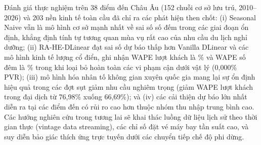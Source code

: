 \documentclass[10pt,journal,compsoc]{IEEEtran}
\begin{document}
Đánh giá thực nghiệm trên 38 điểm đến Châu Âu (152 chuỗi cơ sở lưu trú, 2010--2026) và 203 nền kinh tế toàn cầu đã chỉ ra các phát hiện then chốt: (i) Seasonal Naive vẫn là mô hình cơ sở mạnh nhất về sai số số đếm trong các giai đoạn ổn định, khẳng định tính tự tương quan mùa vụ rất cao của nhu cầu du lịch nghỉ dưỡng; (ii) RA-HE-DLinear đạt sai số dự báo thấp hơn Vanilla DLinear và các mô hình kinh tế lượng cổ điển, ghi nhận WAPE lượt khách là \ReviewerArrivalWAPE{}\% và WAPE số đêm là \ReviewerNightsWAPE{}\% trong khi loại bỏ hoàn toàn các vi phạm cận dưới vật lý (0,000\% PVR); (iii) mô hình hóa nhân tố không gian xuyên quốc gia mang lại sự ổn định hiệu quả trong các đợt sụt giảm nhu cầu nghiêm trọng (giảm WAPE lượt khách trong đại dịch từ 76,98\% xuống 66,69\%); và (iv) các cải thiện dự báo lớn nhất diễn ra tại các điểm đến có rủi ro cao hơn thuộc nhóm thu nhập trung bình cao. Các hướng nghiên cứu trong tương lai sẽ khai thác luồng dữ liệu lịch sử theo thời gian thực (vintage data streaming), các chỉ số đặt vé máy bay tần suất cao, và suy diễn bảo giác thích ứng trực tuyến dưới các chuyển tiếp chế độ phi dừng.
\end{document}
